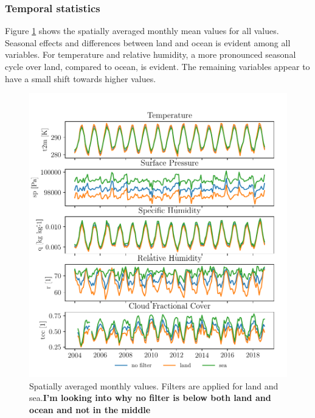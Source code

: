 \subsubsection{Temporal statistics}
Figure \ref{fig:monthly_mean_ts_vars} shows the spatially averaged monthly mean values for all values. Seasonal effects and differences between land and ocean is evident among all variables. For temperature and relative humidity, a more pronounced seasonal cycle over land, compared to ocean, is evident. The remaining variables appear to have a small shift towards higher values.
\begin{figure}[ht]
    \centering
    \includegraphics{python_figs/monthly_means.pdf}
    \caption{Spatially averaged monthly values. Filters are applied for land and sea.\textbf{I'm looking into why no filter is below both land and ocean and not in the middle}}
    \label{fig:monthly_mean_ts_vars}
\end{figure}

